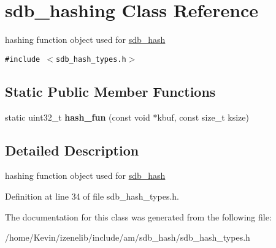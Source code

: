 \hypertarget{classsdb__hashing}{
\section{sdb\_\-hashing Class Reference}
\label{classsdb__hashing}
}
hashing function object used for \hyperlink{classsdb__hash}{sdb\_\-hash}  


{\tt \#include $<$sdb\_\-hash\_\-types.h$>$}

\subsection*{Static Public Member Functions}
\begin{CompactItemize}
\item 
\hypertarget{classsdb__hashing_555fa4737785d01b8c535378cc9e092b}{
static uint32\_\-t \textbf{hash\_\-fun} (const void $\ast$kbuf, const size\_\-t ksize)}
\label{classsdb__hashing_555fa4737785d01b8c535378cc9e092b}

\end{CompactItemize}


\subsection{Detailed Description}
hashing function object used for \hyperlink{classsdb__hash}{sdb\_\-hash} 

Definition at line 34 of file sdb\_\-hash\_\-types.h.

The documentation for this class was generated from the following file:\begin{CompactItemize}
\item 
/home/Kevin/izenelib/include/am/sdb\_\-hash/sdb\_\-hash\_\-types.h\end{CompactItemize}
